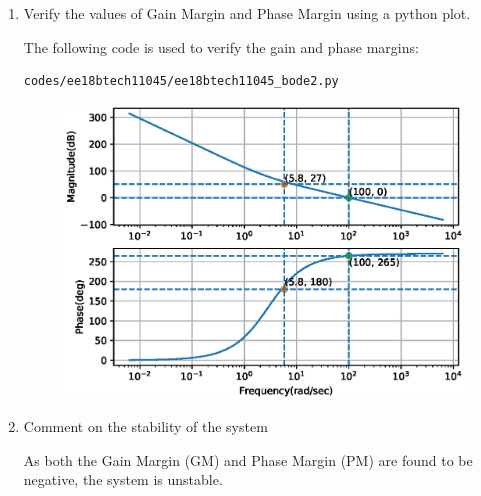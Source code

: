 \begin{enumerate}[label=\thesubsection.\arabic*.,ref=\thesubsection.\theenumi]
\item Verify the values of Gain Margin and Phase Margin using a python plot.

\solution

The following code is used to verify the gain and phase margins:
\begin{lstlisting}
codes/ee18btech11045/ee18btech11045_bode2.py
\end{lstlisting}

\begin{figure}[!ht]
\centering
\includegraphics[width=\columnwidth]{./figs/ee18btech11045/ee18btech11045_bode2.eps}
\caption{}
\label{fig:ee18btech11045_bode2}
\end{figure}


\item Comment on the stability of the system

\solution

As both the Gain Margin (GM) and Phase Margin (PM) are found to be negative, the system is unstable.
\end{enumerate}